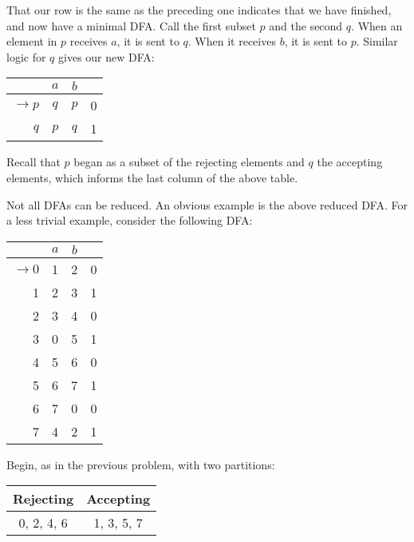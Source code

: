 That our row is the same as the preceding one indicates that we have finished, and now have a minimal DFA. Call the first subset $p$ and the second $q$. When an element in $p$ receives $a$, it is sent to $q$. When it receives $b$, it is sent to $p$. Similar logic for $q$ gives our new DFA:

\begin{center}\begin{tabular}{r| c c r}
         & $a$ & $b$ & \\\hline
         $\to p$ & $q$ & $p$ & 0\\
               $q$ & $p$ & $q$ & 1\\
    \end{tabular}\end{center}

Recall that $p$ began as a subset of the rejecting elements and $q$ the accepting elements, which informs the last column of the above table.
    
Not all DFAs can be reduced. An obvious example is the above reduced DFA. For a less trivial example, consider the following DFA:
   
    \begin{center}\begin{tabular}{r| c c r}
         & $a$ & $b$ & \\\hline
         $\to 0$ & 1 & 2 & 0\\
               1 & 2 & 3 & 1\\
               2 & 3 & 4 & 0\\
               3 & 0 & 5 & 1\\
               4 & 5 & 6 & 0\\
               5 & 6 & 7 & 1\\
               6 & 7 & 0 & 0\\
               7 & 4 & 2 & 1
    \end{tabular}\end{center}

Begin, as in the previous problem, with two partitions:

\begin{center}\begin{tabular}{c|c|c|c|c|c|c|c}
\multicolumn{4}{c|}{Rejecting} & \multicolumn{4}{|c}{Accepting}\\\hline
\multicolumn{4}{c|}{0, 2, 4, 6} & \multicolumn{4}{|c}{1, 3, 5, 7}
\end{tabular}\end{center}

